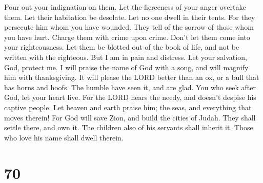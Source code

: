 Pour out your indignation on them. Let the fierceness of
your anger overtake them.  Let their habitation be
desolate. Let no one dwell in their tents.  For they
persecute him whom you have wounded. They tell of the sorrow of those
whom you have hurt.  Charge them with crime upon crime.
Don't let them come into your righteousness.  Let them be
blotted out of the book of life, and not be written with the righteous.
 But I am in pain and distress. Let your salvation, God,
protect me.  I will praise the name of God with a song,
and will magnify him with thanksgiving.  It will please
the LORD better than an ox, or a bull that has horns and hoofs.
 The humble have seen it, and are glad. You who seek
after God, let your heart live.  For the LORD hears the
needy, and doesn't despise his captive people.  Let
heaven and earth praise him; the seas, and everything that moves
therein!  For God will save Zion, and build the cities of
Judah. They shall settle there, and own it.  The children
also of his servants shall inherit it. Those who love his name shall
dwell therein.

\hypertarget{section-69}{%
\section{70}\label{section-69}}


